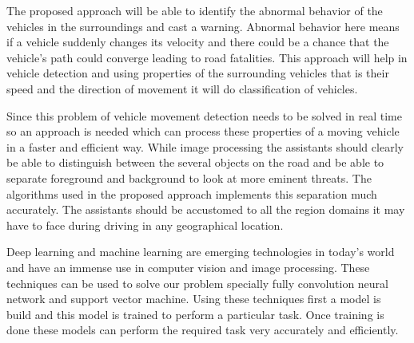 The proposed approach will be able to identify the abnormal behavior of the vehicles in the surroundings and cast a warning. Abnormal behavior here means if a vehicle suddenly changes its velocity and there could be a chance that the vehicle’s path could converge leading to road fatalities. This approach will help in vehicle detection and using properties of the surrounding vehicles that is their speed and the direction of movement it will do classification of vehicles. 


Since this problem of vehicle movement detection needs to be solved in real time so an approach is needed which can process these properties of a moving vehicle in a faster and efficient way. While image processing the assistants should clearly be able to distinguish between the several objects on the road and be able to separate foreground and background to look at more eminent threats. The algorithms used in the proposed approach implements this separation much accurately. The assistants should be accustomed to all the region domains it may have to face during driving in any geographical location.

Deep learning and machine learning are emerging technologies in today’s world and have an immense use in computer vision and image processing. These techniques can be used to solve our problem specially fully convolution neural network and support vector machine. Using these techniques first a model is build and this model is trained to perform a particular task. Once training is done these models can perform the required task very accurately and efficiently.